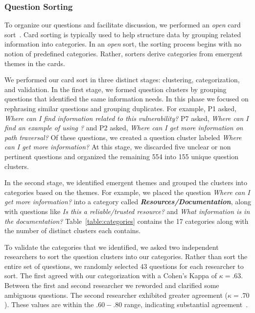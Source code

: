 \documentclass[10pt,journal,compsoc]{IEEEtran}
\begin{document}
\subsubsection{Question Sorting}
To organize our questions and facilitate discussion, we performed an \textit{open} card sort~\cite{hudson2013sorting}. 
Card sorting is typically used to help structure data by grouping related information into categories. 
In an \textit{open} sort, the sorting process begins with no notion of predefined categories. 
Rather, sorters derive categories from emergent themes in the cards. 

We performed our card sort in three distinct stages: clustering, categorization, and validation.
In the first stage, we formed question clusters by grouping questions that identified the same information needs. 
In this phase we focused on rephrasing similar questions and grouping duplicates.
For example, P1 asked, \textit{Where can I find information related to this vulnerability?} P7 asked, \textit{Where can I find an example of using ?} and P2 asked, \textit{Where can I get more information on path traversal?} 
Of these questions, we created a question cluster labeled \textit{Where can I get more information?}
At this stage, we discarded five unclear or non pertinent questions and organized the remaining 554 into 155 unique question clusters.

In the second stage, we identified emergent themes and grouped the clusters into categories based on the themes. 
For example, we placed the question \textit{Where can I get more information?} into a category called \emph{\textbf{Resources/Documentation}}, along with questions like \textit{Is this a reliable/trusted resource?} and \textit{What information is in the documentation?} 
Table~\ref{table:categories} contains the 17 categories along with the number of distinct clusters each contains. 

To validate the categories that we identified, we asked two independent researchers to sort the question clusters into our categories. 
Rather than sort the entire set of questions, we randomly selected 43 questions for each researcher to sort.
The first agreed with our categorization with a Cohen's Kappa of $\kappa = .63$. 
Between the first and second researcher we reworded and clarified some ambiguous questions. The second researcher exhibited greater agreement ($\kappa = .70$). 
These values are within the $.60 - .80$ range, indicating substantial agreement~\cite{Landis1977agreement}.
\end{document}
